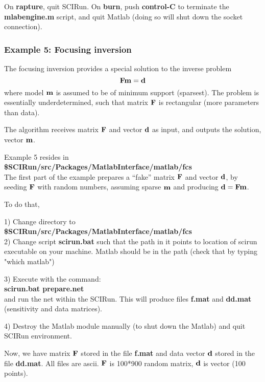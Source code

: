 On {\bf rapture}, quit SCIRun. On {\bf burn}, push {\bf control-C} 
to terminate the {\bf mlabengine.m} script,
and quit Matlab (doing so will shut down the socket connection).

\subsubsection{Example 5: Focusing inversion} \indent


The focusing inversion provides a special solution to the inverse problem
\begin{equation}
{\bf F} {\bf m} = {\bf d} 
\end{equation}
where model ${\bf m}$ is assumed to be of minimum support (sparsest).
The problem is essentially underdetermined, such that
matrix ${\bf F}$ is rectangular (more parameters than data).

The algorithm receives matrix ${\bf F}$ and vector ${\bf d}$
as input, and outputs the solution, vector ${\bf m}$.

Example 5 resides in \\
{\bf \$SCIRun/src/Packages/MatlabInterface/matlab/fcs } \\

The first part of the example prepares a ``fake'' matrix ${\bf F}$ and 
vector ${\bf d}$, by seeding ${\bf F}$ with random numbers,
assuming sparse ${\bf m}$ and producing ${\bf d}={\bf F} {\bf m}$.

To do that, 

1) Change directory to \\
{\bf \$SCIRun/src/Packages/MatlabInterface/matlab/fcs } \\

2) Change script {\bf scirun.bat} such that the path in
   it points to location of scirun executable
   on your machine. Matlab should be in the
   path (check that by typing "which matlab")

3) Execute \sr{} with the command:\\
   {\bf scirun.bat prepare.net }\\
   and run the net within the SCIRun.
   This will produce files {\bf f.mat} and {\bf dd.mat}
   (sensitivity and data matrices).

4) Destroy the Matlab module manually
   (to shut down the Matlab)
   and quit SCIRun environment.

Now, we have matrix ${\bf F}$ stored in the file {\bf f.mat}
and data vector ${\bf d}$ stored in the file {\bf dd.mat}.
All files are ascii. ${\bf F}$ is 100*900 random
matrix, ${\bf d}$ is vector (100 points). 

